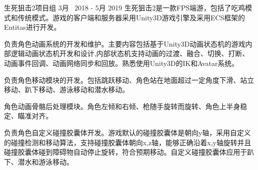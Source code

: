 \begin{cventries}
\cventryproject
{生死狙击2项目组} %
{3月~ 2018 - 5月 2019} %
{生死狙击2是一款FPS端游，包括了吃鸡模式和传统模式。游戏的客户端和服务器采用Unity3D游戏引擎及采用ECS框架的Entitas进行开发。}
{ %
\begin{cvitems}
\item {负责角色动画系统的开发和维护。主要内容包括基于Unity3D动画状态机的游戏内部逻辑动画状态机开发和设计,内部状态机支持动画的过渡、融合、切换、打断、动画事件回调、动画网络同步和回放。熟悉使用Unity3D的IK和Avatar系统。}
\item{负责角色移动模块的开发。包括跳跃移动、角色站在地面超过一定角度下滑、站立移动、趴下移动、游泳移动和潜水移动。}
\item{角色动画骨骼后处理模块。角色左倾和右倾、枪随手旋转而旋转、角色上半身稳定、瞄准对齐。}
\item{负责角色自定义碰撞胶囊体开发。游戏默认的碰撞胶囊体是朝向y轴，采用自定义的碰撞检测和移动算法，支持碰撞胶囊体朝向x,z轴，能够正确沿着x,y轴旋转并且碰撞胶囊体碰到障碍物自动停止旋转，符合预期移动。自定义碰撞胶囊体应用于趴下、潜水和游泳移动。}
\end{cvitems}
}


\end{cventries}
